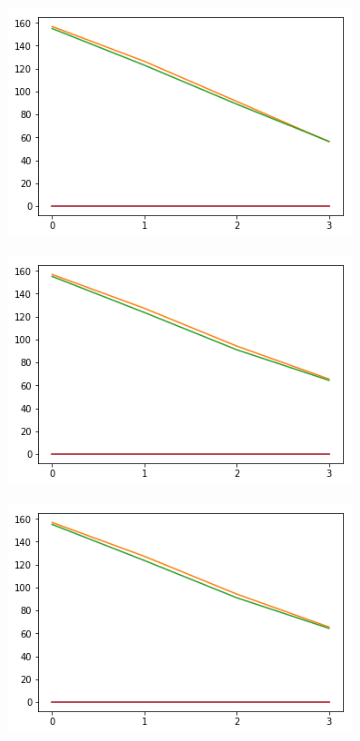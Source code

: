 \begin{figure}[h!]
  \centering
  \begin{subfigure}[b]{0.3\linewidth}
    \includegraphics[width=\linewidth]{images/add/ef0_means.png}
    \caption{}
  \end{subfigure}
  \begin{subfigure}[b]{0.3\linewidth}
    \includegraphics[width=\linewidth]{images/add/ef1_means.png}
    \caption{}
  \end{subfigure}
  \begin{subfigure}[b]{0.3\linewidth}
    \includegraphics[width=\linewidth]{images/add/ef2_means.png}
    \caption{}
  \end{subfigure}
  

\end{figure}
